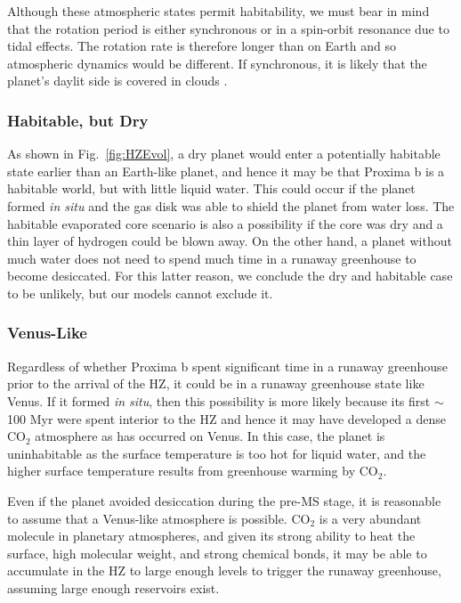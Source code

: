 \documentclass[preprint,12pt]{aastex}
\begin{document}
Although these atmospheric states permit habitability, we must bear in
mind that the rotation period is either synchronous or in a spin-orbit
resonance due to tidal effects. The rotation rate is therefore longer
than on Earth and so atmospheric dynamics would be different. If
synchronous, it is likely that the planet's daylit side is
covered in clouds \citep{Yang13}.

\subsubsection{Habitable, but Dry}

As shown in Fig.~\ref{fig:HZEvol}, a dry planet would enter a
potentially habitable state earlier than an Earth-like planet, and
hence it may be that Proxima b is a habitable world, but with little
liquid water. This could occur if the planet formed {\it in situ} and
the gas disk was able to shield the planet from water loss. The
habitable evaporated core scenario is also a possibility if the core
was dry and a thin layer of hydrogen could be blown away. On the other
hand, a planet without much water does not need to spend much time in
a runaway greenhouse to become desiccated. For this latter reason, we
conclude the dry and habitable case to be unlikely, but our models
cannot exclude it.

\subsubsection{Venus-Like}
\label{sec:results:atmstates:venuslike}

Regardless of whether Proxima b spent significant time in a runaway
greenhouse prior to the arrival of the HZ, it could be in a runaway
greenhouse state like Venus. If it formed {\it in situ}, then this
possibility is more likely because its first $\sim$100 Myr were spent
interior to the HZ and hence it may have developed a dense CO$_2$
atmosphere as has occurred on Venus. In this case, the planet is
uninhabitable as the surface temperature is too hot for liquid water,
and the higher surface temperature results from greenhouse warming by
CO$_2$.

Even if the planet avoided desiccation during the pre-MS stage, it is
reasonable to assume that a Venus-like atmosphere is possible. CO$_2$
is a very abundant molecule in planetary atmospheres, and given its
strong ability to heat the surface, high molecular weight, and strong
chemical bonds, it may be able to accumulate in the HZ to large enough
levels to trigger the runaway greenhouse, assuming large enough
reservoirs exist.
\end{document}
